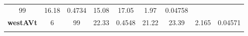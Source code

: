 \documentclass[]{article}
\theoremstyle{definition}
\theoremstyle{definition}
\theoremstyle{definition}
\theoremstyle{remark}
\begin{document}
\begin{longtable}[]{@{}ccccccccc@{}}
\begin{minipage}[t]{0.05\columnwidth}
99\strut
\end{minipage} & \begin{minipage}[t]{0.11\columnwidth}\centering\strut
16.18\strut
\end{minipage} & \begin{minipage}[t]{0.08\columnwidth}\centering\strut
0.4734\strut
\end{minipage} & \begin{minipage}[t]{0.08\columnwidth}\centering\strut
15.08\strut
\end{minipage} & \begin{minipage}[t]{0.07\columnwidth}\centering\strut
17.05\strut
\end{minipage} & \begin{minipage}[t]{0.07\columnwidth}\centering\strut
1.97\strut
\end{minipage} & \begin{minipage}[t]{0.08\columnwidth}\centering\strut
0.04758\strut
\end{minipage}\tabularnewline
\begin{minipage}[t]{0.14\columnwidth}\centering\strut
\textbf{westAVt}\strut
\end{minipage} & \begin{minipage}[t]{0.06\columnwidth}\centering\strut
6\strut
\end{minipage} & \begin{minipage}[t]{0.05\columnwidth}\centering\strut
99\strut
\end{minipage} & \begin{minipage}[t]{0.11\columnwidth}\centering\strut
22.33\strut
\end{minipage} & \begin{minipage}[t]{0.08\columnwidth}\centering\strut
0.4548\strut
\end{minipage} & \begin{minipage}[t]{0.08\columnwidth}\centering\strut
21.22\strut
\end{minipage} & \begin{minipage}[t]{0.07\columnwidth}\centering\strut
23.39\strut
\end{minipage} & \begin{minipage}[t]{0.07\columnwidth}\centering\strut
2.165\strut
\end{minipage} & \begin{minipage}[t]{0.08\columnwidth}\centering\strut
0.04571\strut
\end{minipage}\tabularnewline
\begin{minipage}[t]{0.14\columnwidth}\centering\strut

\end{minipage}
\end{longtable}
\end{document}
